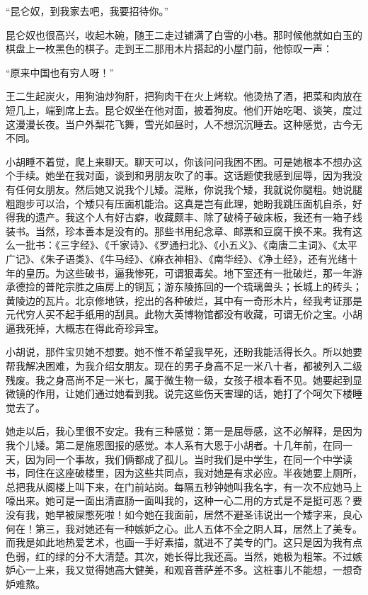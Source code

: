 “昆仑奴，到我家去吧，我要招待你。” 

昆仑奴也很高兴，收起木碗，随王二走过铺满了白雪的小巷。那时候他就如白玉的棋盘上一枚黑色的棋子。走到王二那用木片搭起的小屋门前，他惊叹一声： 

“原来中国也有穷人呀！” 

王二生起炭火，用狗油炒狗肝，把狗肉干在火上烤软。他烫热了酒，把菜和肉放在短几上，端到席上去。昆仑奴坐在他对面，披着狗皮。他们开始吃喝、谈笑，度过这漫漫长夜。当户外梨花飞舞，雪光如昼时，人不想沉沉睡去。这种感觉，古今无不同。 

小胡睡不着觉，爬上来聊天。聊天可以，你该问问我困不困。可是她根本不想办这个手续。她坐在我对面，谈到和男朋友吹了的事。这话题使我感到屈辱，因为我没有任何女朋友。然后她又说我个儿矮。混账，你说我个矮，我就说你腿粗。她说腿粗跑步可以治，个矮只有压面机能治。这真是岂有此理，她盼我跳压面机自杀，好得我的遗产。我这个人有好古癖，收藏颇丰、除了破椅子破床板，我还有一箱子线装书。当然，珍本善本是没有的。那些书用纪念章、邮票和豆腐干换不来。我有这么一批书：《三字经》、《千家诗》、《罗通扫北》、《小五义》、《南唐二主词》、《太平广记》、《朱子语类》、《牛马经》、《麻衣神相》、《南华经》、《净土经》，还有光绪十年的皇历。为这些破书，逼我惨死，可谓狠毒矣。地下室还有一批破烂，那一年游承德捡的普陀宗胜之庙房上的铜瓦；游东陵拣回的一个琉璃兽头；长城上的砖头；黄陵边的瓦片。北京修地铁，挖出的各种破烂，其中有一奇形木片，经我考证那是元代穷人买不起手纸用的刮具。此物大英博物馆都没有收藏，可谓无价之宝。小胡逼我死掉，大概志在得此奇珍异宝。 

小胡说，那件宝贝她不想要。她不惟不希望我早死，还盼我能活得长久。所以她要帮我解决困难，为我介绍女朋友。现在的男子身高不足一米八十者，都被列入二级残废。我之身高尚不足一米七，属于微生物一级，女孩子根本看不见。她要起到显微镜的作用，让她们通过她看到我。说完这些伤天害理的话，她打了个呵欠下楼睡觉去了。 

她走以后，我心里很不安定。我有三种感觉：第一是屈辱感，这不必解释，是因为我个儿矮。第二是施恩图报的感觉。本人系有大恩于小胡者。十几年前，在同一天，因为同一个事故，我们俩都成了孤儿。当时我们是中学生，在同一个中学读书，同住在这座破楼里，因为这些共同点，我对她是有求必应。半夜她要上厕所，总把我从阁楼上叫下来，在门前站岗。每隔五秒钟她叫我名字，有一次不应她马上嚎出来。她可是一面出清直肠一面叫我的，这种一心二用的方式是不是挺可恶？要没有我，她早被屎憋死啦！如今她在我面前，居然不避圣讳说出一个矮字来，良心何在！第三，我对她还有一种嫉妒之心。此人五体不全之阴人耳，居然上了美专。而我是如此地热爱艺术，也画一手好素描，就进不了美专的门。这只是因为我有点色弱，红的绿的分不大清楚。其次，她长得比我还高。当然，她极为粗笨。不过嫉妒心一上来，我又觉得她高大健美，和观音菩萨差不多。这桩事儿不能想，一想奇妒难熬。 

